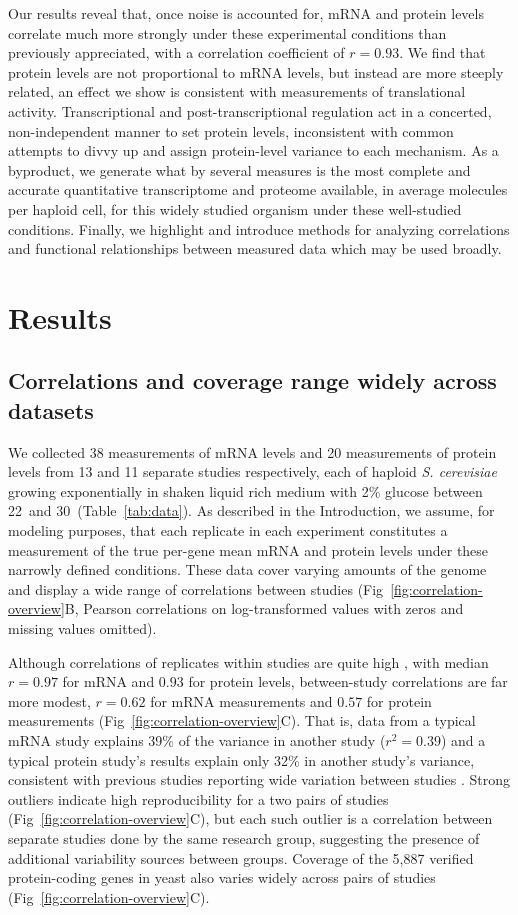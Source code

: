\documentclass[10pt]{article}
\begin{document}
Our results reveal that, once noise is accounted for, mRNA and protein levels correlate much more strongly under these experimental conditions than previously appreciated, with a correlation coefficient of $r = 0.93$. We find that protein levels are not proportional to mRNA levels, but instead are more steeply related, an effect we show is consistent with measurements of translational activity. Transcriptional and post-transcriptional regulation act in a concerted, non-independent manner to set protein levels, inconsistent with common attempts to divvy up and assign protein-level variance to each mechanism. As a byproduct, we generate what by several measures is the most complete and accurate quantitative transcriptome and proteome available, in average molecules per haploid cell, for this widely studied organism under these well-studied conditions. Finally, we highlight and introduce methods for analyzing correlations and functional relationships between measured data which may be used broadly.

\section*{Results}

\subsection*{Correlations and coverage range widely across datasets}
We collected 38 measurements of mRNA levels and 20 measurements of
protein levels from 13 and 11 separate studies respectively, each of
haploid \emph{S. cerevisiae} growing exponentially in shaken liquid
rich medium with 2\% glucose between 22\celsius~and
30\celsius~(Table~\ref{tab:data}). As described in the Introduction, we assume, for modeling purposes, that each 
replicate in each experiment constitutes a measurement of the true per-gene mean mRNA and protein levels under these narrowly defined conditions.
These data cover varying amounts of the genome
and display a wide range of correlations between studies
(Fig~\ref{fig:correlation-overview}B, Pearson correlations on log-transformed values
with zeros and missing values omitted). 

Although correlations of
replicates within studies are quite high \cite{vogel12}, with median
\(r=0.97\) for mRNA and \(0.93\) for protein levels, between-study
correlations are far more modest, \(r=0.62\) for mRNA measurements and
\(0.57\) for protein measurements (Fig~\ref{fig:correlation-overview}C). That is, data from a typical mRNA
study explains 39\% of the variance in another study (\(r^2=0.39\))
and a typical protein study's results explain only 32\% in another
study's variance, consistent with previous studies reporting wide
variation between studies \cite{wang12}.  Strong outliers indicate
high reproducibility for a two pairs of studies
(Fig~\ref{fig:correlation-overview}C), but each such outlier is a correlation
between separate studies done by the same research group, suggesting
the presence of additional variability sources between groups. Coverage of the 5,887 verified protein-coding genes in yeast \cite{cherry12} also varies widely across pairs of studies (Fig~\ref{fig:correlation-overview}C).
\end{document}
